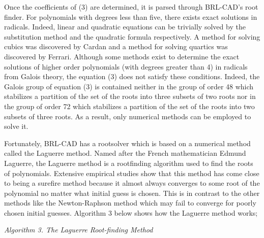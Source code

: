 \hspace{30} Once   the   coefficients   of   (3)   are   determined,   it   is   parsed   through  
BRL­-CAD's   root   finder.   For   polynomials   with   degrees   less   than   five,   there  
exists   exact   solutions   in   radicals.   Indeed,   linear   and   quadratic   equations   can   be  
trivially   solved   by   the   substitution   method   and   the   quadratic   formula  
respectively.   A   method   for   solving   cubics   was   discovered   by   Cardan   and   a  
method   for   solving   quartics   was   discovered   by   Ferrari.   Although   some  
methods   exist   to   determine   the   exact   solutions   of   higher   order   polynomials  
(with   degrees   greater   than   4)   in   radicals   from   Galois   theory,   the   equation   (3)  
does   not   satisfy   these   conditions.   Indeed,   the   Galois   group   of   equation   (3)   is  
contained   neither   in   the   group   of   order   48   which   stabilizes   a   partition   of   the   set  
of   the   roots   into   three   subsets   of   two   roots   nor   in   the   group   of   order   72   which  
stabilizes   a   partition   of   the   set   of   the   roots   into   two   subsets   of   three   roots.   As   a  
result, only numerical methods can be employed to solve it.  
 
\hspace{30} Fortunately,   BRL-­CAD   has   a   root­solver   which   is   based   on   a   numerical  
method   called   the   Laguerre   method.   Named   after   the   French   mathematician  
Edmund   Laguerre,   the   Laguerre   method   is   a   root­finding   algorithm   used   
to find the roots of polynomials.   Extensive   empirical   studies   show   that   this   method   has   come  
close   to   being   a   sure­fire   method   because   it   almost   always   converges   to   some  
root   of   the   polynomial   no   matter   what   initial   guess   is   chosen.   This   is   in   contrast  
to   the   other   methods   like   the   Newton­-Raphson   method   which   may   fail   to  
converge   for   poorly   chosen   initial   guesses.   Algorithm   3   below   shows   how   the  
Laguerre method works;  

\hspace{85} \textit{Algorithm 3. The Laguerre Root­-finding Method}

